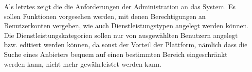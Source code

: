 Als letztes zeigt die  die Anforderungen der Administration an das System. Es sollen Funktionen vorgesehen werden, mit denen Berechtigungen an Benutzerkonten vergeben, wie auch Dienstleistungstypen angelegt werden können. Die Dienstleistungskategorien sollen nur von ausgewählten Benutzern angelegt bzw. editiert werden können, da sonst der Vorteil der Plattform, nämlich dass die Suche eines Anbieters bequem auf einen bestimmten Bereich eingeschränkt werden kann, nicht mehr gewährleistet werden kann.
